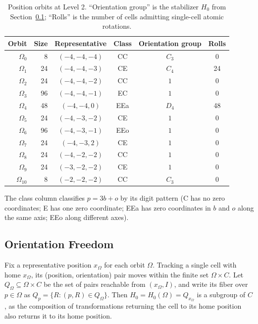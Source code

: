\documentclass[a4paper,11pt]{article}
\begin{document}
\begin{table}[ht]
\centering
\caption{Position orbits at Level 2. ``Orientation group'' is the stabilizer $H_0$ from Section~\ref{subsec:freedom}; ``Rolls'' is the number of cells admitting single-cell atomic rotations.}\label{tab:orbits}
\begin{tabular}{rrcccc}
\toprule
Orbit & Size & Representative & Class & Orientation group & Rolls \\
\midrule
$\Omega_0$ & 8 & $(-4,-4,-4)$ & CC & $C_3$ & 0 \\
$\Omega_1$ & 24 & $(-4,-4,-3)$ & CE & $C_4$ & 24 \\
$\Omega_2$ & 24 & $(-4,-4,-2)$ & CC & $1$ & 0 \\
$\Omega_3$ & 96 & $(-4,-4,-1)$ & EC & $1$ & 0 \\
$\Omega_4$ & 48 & $(-4,-4,0)$ & EEa & $D_4$ & 48 \\
$\Omega_5$ & 24 & $(-4,-3,-2)$ & CE & $1$ & 0 \\
$\Omega_6$ & 96 & $(-4,-3,-1)$ & EEo & $1$ & 0 \\
$\Omega_7$ & 24 & $(-4,-3,2)$ & CE & $1$ & 0 \\
$\Omega_8$ & 24 & $(-4,-2,-2)$ & CC & $1$ & 0 \\
$\Omega_9$ & 24 & $(-3,-2,-2)$ & CE & $1$ & 0 \\
$\Omega_{10}$ & 8 & $(-2,-2,-2)$ & CC & $C_3$ & 0 \\
\bottomrule
\end{tabular}
\end{table}

The class column classifies $p=3b+o$ by its digit pattern (\textnormal{C} has no zero coordinates; \textnormal{E} has one zero coordinate; \textnormal{EEa} has zero coordinates in $b$ and $o$ along the same axis; \textnormal{EEo} along different axes).

\subsection{Orientation Freedom}\label{subsec:freedom}

Fix a representative position $x_\Omega$ for each orbit $\Omega$.
Tracking a single cell with home $x_\Omega$, its (position, orientation) pair moves within the finite set $\Omega\times C$.
Let $Q_\Omega\subseteq\Omega\times C$ be the set of pairs reachable from $(x_\Omega,I)$, and write its fiber over $p\in\Omega$ as $Q_p=\{R:(p,R)\in Q_\Omega\}$.
Then $H_0=H_0(\Omega)=Q_{x_\Omega}$ is a subgroup of $C$, as the composition of transformations returning the cell to its home position also returns it to its home position.
\end{document}
